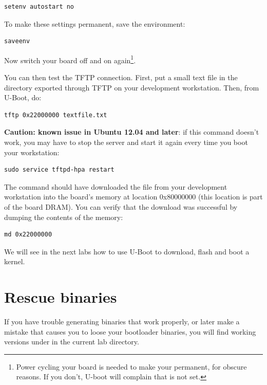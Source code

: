 \begin{verbatim}
setenv autostart no
\end{verbatim}

To make these settings permanent, save the environment:

\begin{verbatim}
saveenv
\end{verbatim}

Now switch your board off and on again\footnote{Power cycling your
  board is needed to make your  permanent, for obscure
  reasons. If you don't, U-boot will complain that  is not
  set.}.

You can then test the TFTP connection. First, put a small text file in
the directory exported through TFTP on your development
workstation. Then, from U-Boot, do:

\begin{verbatim}
tftp 0x22000000 textfile.txt
\end{verbatim}

{\bf Caution: known issue in Ubuntu 12.04 and later}:
if this command doesn't work, you may have to stop the server
and start it again every time you boot your workstation:

\begin{verbatim}
sudo service tftpd-hpa restart
\end{verbatim}

The  command should have downloaded
the  file from your development
workstation into the board's memory at location 0x80000000 (this
location is part of the board DRAM). You can verify that the download
was successful by dumping the contents of the memory:

\begin{verbatim}
md 0x22000000
\end{verbatim}

We will see in the next labs how to use U-Boot to download, flash and
boot a kernel.

\section{Rescue binaries}

If you have trouble generating binaries that work properly, or later
make a mistake that causes you to loose your bootloader binaries, you
will find working versions under  in the current lab
directory.
